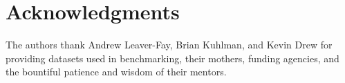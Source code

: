 \section{Acknowledgments}
The authors thank Andrew Leaver-Fay, Brian Kuhlman, and Kevin Drew  for providing datasets used in benchmarking, their mothers, funding agencies, and the bountiful patience and wisdom of their mentors.
